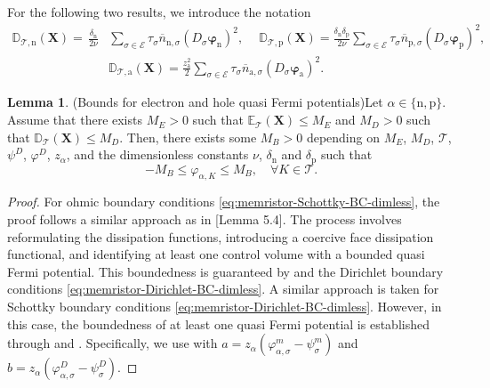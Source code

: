 \documentclass[10pt,a4paper, final]{article}
\def\electrons{\text{n}}
\def\holes{\text{p}}
\def\ions{\text{a}}
\theoremstyle{definition}								%
\newtheorem{lemma}[theorem]{Lemma}					%
\numberwithin{equation}{section}
\numberwithin{figure}{section}
\numberwithin{theorem}{section}
\begin{document}
For the following two results, we introduce the notation
\begin{align*}
    {\mathbb D}_{\mathcal{T},\electrons}(\mathbf{X} )= \, \frac{ \delta_\electrons }{2 \nu } &\sum_{\sigma \in \mathcal{E} }\tau_\sigma \overline{n}_{\electrons, \sigma}  ( D_{\sigma} \boldsymbol{\varphi}_{\electrons})^2, \quad
    ~
    {\mathbb D}_{\mathcal{T},\holes}(\mathbf{X} )= \frac{ \delta_\electrons \delta_\holes }{2 \nu } \sum_{\sigma \in \mathcal{E} }\tau_\sigma \overline{n}_{\holes, \sigma}  ( D_{\sigma} \boldsymbol{\varphi}_{\holes})^2, \\
    ~
    &{\mathbb D}_{\mathcal{T},\ions}(\mathbf{X})=\frac{ z_{\ions}^2 }{2}\sum_{\sigma \in \mathcal{E} }\tau_\sigma \overline{n}_{\ions,\sigma}  ( D_{\sigma} \boldsymbol{\varphi}_{\ions})^2.
\end{align*}
\begin{lemma}(Bounds for electron and hole quasi Fermi potentials)\label{lem.bounds.phialpha}
    Let $\alpha \in \{ \electrons, \holes \}$.
    Assume that there exists $M_E>0$ such that ${\mathbb E}_\mathcal{T}(\mathbf{X})\leq M_E$ and $M_{D}>0$ such that ${\mathbb D}_{\mathcal{T}}(\mathbf{X})\leq M_{D}$.
    Then, there exists some $ M_B > 0$ depending on $M_E$, $M_D$, $\mathcal{T}$, $\psi^D$, $\varphi^D$, $z_\alpha$, and the dimensionless constants $\nu$, $\delta_\electrons$ and $\delta_\holes$ such that
    \begin{equation}\label{bounds.phialpha}
        - M_B \leq \varphi_{\alpha,K} \leq M_B, \quad \forall K\in\mathcal{T}.
    \end{equation}
\end{lemma}
\begin{proof}
    For ohmic boundary conditions \eqref{eq:memristor-Schottky-BC-dimless}, the proof follows a similar approach as in \cite{Abdel2023Existence}[Lemma 5.4].
    The process involves reformulating the dissipation functions, introducing a coercive face dissipation functional, and identifying at least one control volume with a bounded quasi Fermi potential.
    This boundedness is guaranteed by  and the Dirichlet boundary conditions \eqref{eq:memristor-Dirichlet-BC-dimless}.
    A similar approach is taken for Schottky boundary conditions \eqref{eq:memristor-Dirichlet-BC-dimless}.
    However, in this case, the boundedness of at least one quasi Fermi potential is established through  and .
    Specifically, we use  with $a = z_\alpha (\varphi_{\alpha, \sigma}^m - \psi_\sigma^m)$ and $b = z_\alpha (\varphi_{\alpha, \sigma}^D - \psi_\sigma^D)$.
\end{proof}
\end{document}
